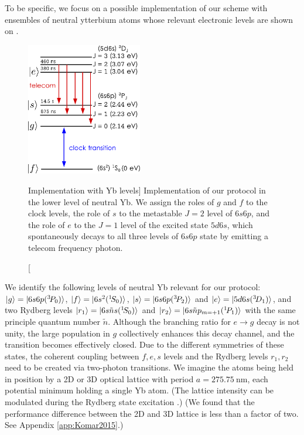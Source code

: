 To be specific, we focus on a possible implementation of our scheme with
ensembles of neutral ytterbium atoms whose relevant electronic levels are shown on
.
\begin{figure}[h]
\centering
\includegraphics[width=0.45\textwidth]{./figs_Komar2015/Yb_levels.pdf}
\caption
[Implementation with Yb levels]
{ 
\label{fig:Yb_levels}
Implementation of our protocol in the lower level of neutral Yb. We assign
the roles of $g$ and $f$ to the clock levels, the role of $s$ to the metastable
$J=2$ level of $6s6p$, and the role of $e$ to the $J=1$ level of the excited
state $5d6s$, which spontaneously decays to all three levels of $6s6p$ state by
emitting a telecom frequency photon.}
\end{figure}
We identify the  following levels of neutral
Yb  relevant for our protocol:
$| g \rangle =
| 6s6p({}^3\!P_0) \rangle$, $| f \rangle = | 6s^2({}^1\!S_0) \rangle$, $| s \rangle =
| 6s6p({}^3\!P_2) \rangle$ and $| e \rangle = | 5d6s({}^3\!D_1) \rangle$, and two Rydberg
levels $| r_1 \rangle = | 6s\tilde n s({}^1\!S_0) \rangle$ and $| r_2 \rangle =
| 6s\tilde n p_{m=+1}({}^1\!P_1) \rangle$ with the same principle
quantum number $\tilde n$. 
Although the branching ratio for $e\rightarrow g$ decay is not unity, the
large population in $g$ collectively enhances this decay channel, and the
transition becomes effectively closed. Due to the different symmetries of these
states, the coherent coupling between $f,e, s$ levels and the Rydberg levels
$r_1, r_2$ need to be created via two-photon transitions. We imagine the atoms
being held in position by a 2D or 3D optical lattice with period $a =
275.75~\mathrm{nm}$, each potential minimum holding a single Yb atom. (The lattice
intensity can be modulated during the Rydberg state excitation
\cite{Tiecke2014}.)  (We found that the performance difference between the 2D
and 3D lattice is less than a factor of two. See Appendix \ref{app:Komar2015}.)
 
